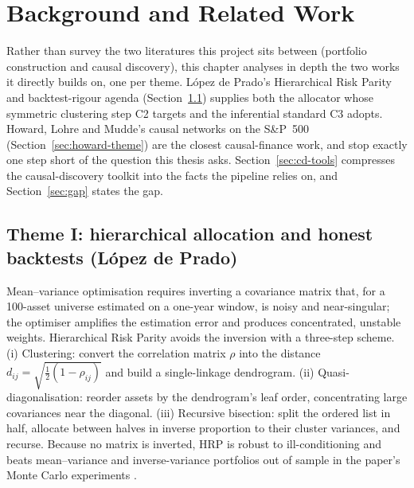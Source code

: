 \chapter{Background and Related Work}
\label{chap:background}

Rather than survey the two literatures this project sits between (portfolio
construction and causal discovery), this chapter analyses in depth the two
works it directly builds on, one per theme. L\'opez de Prado's Hierarchical
Risk Parity and backtest-rigour agenda (Section~\ref{sec:hrp-theme}) supplies
both the allocator whose symmetric clustering step C2 targets and the
inferential standard C3 adopts. Howard, Lohre and Mudde's causal networks on
the S\&P~500 (Section~\ref{sec:howard-theme}) are the closest causal-finance
work, and stop exactly one step short of the question this thesis asks.
Section~\ref{sec:cd-tools}
compresses the causal-discovery toolkit into the facts the pipeline relies
on, and Section~\ref{sec:gap} states the gap.

\section{Theme I: hierarchical allocation and honest backtests
(L\'opez de Prado)}
\label{sec:hrp-theme}

Mean--variance optimisation \cite{markowitz1952portfolio} requires inverting a
covariance matrix that, for a 100-asset universe estimated on a one-year
window, is noisy and near-singular; the optimiser amplifies the estimation
error and produces concentrated, unstable weights. Hierarchical Risk Parity
\cite{lopezdeprado2016hrp} avoids the inversion with a three-step scheme.
(i) Clustering: convert the correlation matrix $\rho$ into the
distance $d_{ij} = \sqrt{\tfrac{1}{2}(1-\rho_{ij})}$ and build a
single-linkage dendrogram. (ii) Quasi-diagonalisation: reorder assets
by the dendrogram's leaf order, concentrating large covariances near the
diagonal. (iii) Recursive bisection: split the ordered list in half,
allocate between halves in inverse proportion to their cluster variances, and
recurse. Because no matrix is inverted, HRP is robust to ill-conditioning and
beats mean--variance and inverse-variance portfolios out of sample in
the paper's Monte Carlo experiments \cite{lopezdeprado2016hrp}.

